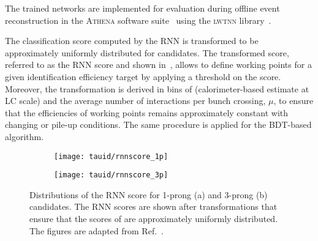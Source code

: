 The trained networks are implemented for evaluation during offline
event reconstruction in the \textsc{Athena} software
suite~\cite{ATL-SOFT-PUB-2021-001} using the \textsc{lwtnn}
library~\cite{lwtnn}.

The classification score computed by the RNN \tauid is transformed to
be approximately uniformly distributed for \truetauhadvis
candidates. The transformed score, referred to as the RNN score and
shown in~, allows to define working
points for a given \truetauhadvis identification efficiency target by
applying a threshold on the score. Moreover, the transformation is
derived in bins of \tauhadvis \pT (calorimeter-based \pT estimate at
LC scale) and the average number of interactions per bunch crossing,
$\mu$, to ensure that the \truetauhadvis efficiencies of working
points remains approximately constant with changing \tauhadvis \pT or
pile-up conditions. The same procedure is applied for the BDT-based
\tauid algorithm.

\begin{figure}[htbp]
  \centering

  \begin{subfigure}{0.498\textwidth}
    \texttt{[image: tauid/rnnscore\_1p]}
    \subcaption{}
  \end{subfigure}\hfill%
  \begin{subfigure}{0.498\textwidth}
    \texttt{[image: tauid/rnnscore\_3p]}
    \subcaption{}
  \end{subfigure}

  \caption[Distributions of the RNN score for 1-prong and 3-prong \tauhadvis
  candidates.]{Distributions of the RNN score for 1-prong (a) and 3-prong (b)
    \tauhadvis candidates. The RNN scores are shown after transformations that
    ensure that the scores of \truetauhadvis are approximately uniformly
    distributed. The figures are adapted from
    Ref.~\cite{ATL-PHYS-PUB-2019-033}.}%
  \label{fig:flattened_rnnscore}
\end{figure}

